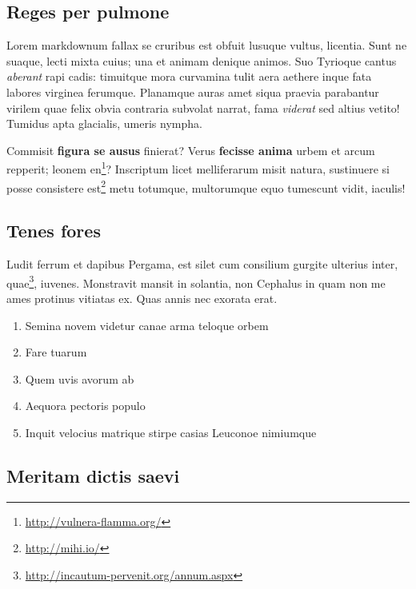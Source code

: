 \documentclass[
  12pt,
  a4paper,
  oneside,tablecaptionabove
]{scrbook}
\DeclareRobustCommand{\href}[2]{#2\footnote{\url{#1}}}
\providecommand{\tightlist}{%
  \setlength{\itemsep}{0pt}\setlength{\parskip}{0pt}}
\renewenvironment{quote}{\begin{customblockquote}\list{}{\rightmargin=0em\leftmargin=0em}%
\item\relax\color{blockquote-text}\ignorespaces}{\unskip\unskip\endlist\end{customblockquote}}
\begin{document}
\hypertarget{reges-per-pulmone}{%
\subsection{Reges per pulmone}\label{reges-per-pulmone}}

Lorem markdownum fallax se cruribus est obfuit lusuque vultus, licentia.
Sunt ne suaque, lecti mixta cuius; una et animam denique animos. Suo
Tyrioque cantus \emph{aberant} rapi cadis: timuitque mora curvamina
tulit aera aethere inque fata labores virginea ferumque. Planamque auras
amet siqua praevia parabantur virilem quae felix obvia contraria
subvolat narrat, fama \emph{viderat} sed altius vetito! Tumidus apta
glacialis, umeris nympha.

\begin{quote}
Commisit \textbf{figura se ausus} finierat? Verus \textbf{fecisse anima}
urbem et arcum repperit; leonem \href{http://vulnera-flamma.org/}{en}?
Inscriptum licet melliferarum misit natura, sustinuere si posse
\href{http://mihi.io/}{consistere est} metu totumque, multorumque equo
tumescunt vidit, iaculis!
\end{quote}

\hypertarget{tenes-fores}{%
\subsection{Tenes fores}\label{tenes-fores}}

Ludit ferrum et dapibus Pergama, est silet cum consilium gurgite
ulterius inter, \href{http://incautum-pervenit.org/annum.aspx}{quae},
iuvenes. Monstravit mansit in solantia, non Cephalus in quam non me ames
protinus vitiatas ex. Quas annis nec exorata erat.

\begin{enumerate}
\def\labelenumi{\arabic{enumi}.}
\tightlist
\item
  Semina novem videtur canae arma teloque orbem
\item
  Fare tuarum
\item
  Quem uvis avorum ab
\item
  Aequora pectoris populo
\item
  Inquit velocius matrique stirpe casias Leuconoe nimiumque
\end{enumerate}

\hypertarget{meritam-dictis-saevi}{%
\subsection{Meritam dictis saevi}\label{meritam-dictis-saevi}}
\end{document}
